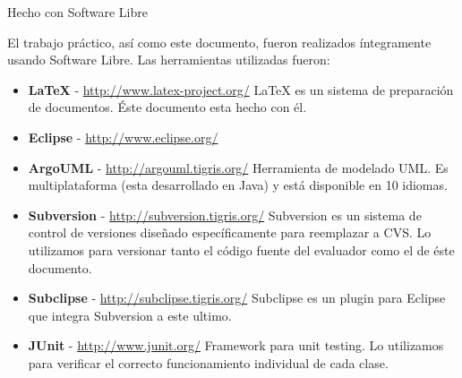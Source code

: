 %
% 
%

\thispagestyle{empty}

\begin{center}
\LARGE{Hecho con Software Libre}
\end{center}

\noindent

El trabajo práctico, así como este documento, fueron realizados íntegramente
usando Software Libre. Las herramientas utilizadas fueron:

\begin{flushleft}
\begin{itemize}

\item \textbf{\LaTeX} - \href{http://www.latex-project.org/}
  {http://www.latex-project.org/}
\linebreak\LaTeX{} es un sistema de preparación de documentos. Éste
  documento esta hecho con él.

\item \textbf{Eclipse} - \href{http://www.eclipse.org/}
  {http://www.eclipse.org/}

\item \textbf{ArgoUML} - \href{http://argouml.tigris.org/}
  {http://argouml.tigris.org/}
\linebreak Herramienta de modelado UML. Es multiplataforma (esta desarrollado
en Java) y está disponible en 10 idiomas.

\item \textbf{Subversion} - \href{http://subversion.tigris.org/}
  {http://subversion.tigris.org/}
\linebreak Subversion es un sistema de control de versiones diseñado
  específicamente para reemplazar a CVS. Lo utilizamos para versionar
  tanto el código fuente del evaluador como el de éste documento.

\item \textbf{Subclipse} - \href{http://subclipse.tigris.org/}
{http://subclipse.tigris.org/}
\linebreak Subclipse es un plugin para Eclipse que integra Subversion a este
ultimo.

\item \textbf{JUnit} - \href{http://www.junit.org/}
  {http://www.junit.org/}
\linebreak Framework para unit testing. Lo utilizamos para verificar el correcto
funcionamiento individual de cada clase.


\end{itemize}
\end{flushleft}
